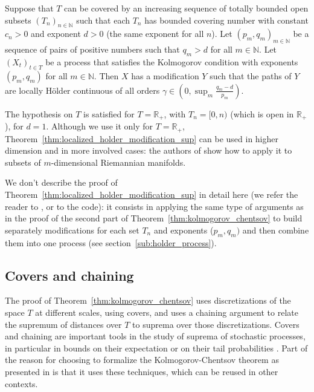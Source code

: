 \documentclass[lean]{Draft}
\begin{document}
\begin{theorem}\label{thm:localized_holder_modification_sup}
Suppose that $T$ can be covered by an increasing sequence of totally bounded open subsets $(T_n)_{n \in \mathbb{N}}$ such that each $T_n$ has bounded covering number with constant $c_n > 0$ and exponent $d > 0$ (the same exponent for all $n$).
Let $(p_m, q_m)_{m \in \mathbb{N}}$ be a sequence of pairs of positive numbers such that $q_m > d$ for all $m \in \mathbb{N}$.
Let $(X_t)_{t \in T}$ be a process that satisfies the Kolmogorov condition with exponents $(p_m, q_m)$ for all $m \in \mathbb{N}$.
Then $X$ has a modification $Y$ such that the paths of $Y$ are locally Hölder continuous of all orders $\gamma \in \left(0, \sup_m \frac{q_m - d}{p_m}\right)$.
\end{theorem}

The hypothesis on $T$ is satisfied for $T = \mathbb{R}_+$, with $T_n = [0,n)$ (which is open in $\mathbb{R}_+$), for $d = 1$.
Although we use it only for $T = \mathbb{R}_+$, Theorem~\ref{thm:localized_holder_modification_sup} can be used in higher dimension and in more involved cases: the authors of \cite{kratschmer2023kolmogorov} show how to apply it to subsets of $m$-dimensional Riemannian manifolds.

We don't describe the proof of Theorem~\ref{thm:localized_holder_modification_sup} in detail here (we refer the reader to \cite{kratschmer2023kolmogorov}, or to the code): it consists in applying the same type of arguments as in the proof of the second part of Theorem~\ref{thm:kolmogorov_chentsov} to build separately modifications for each set $T_n$ and exponents ($p_m, q_m)$ and then combine them into one process (see section~\ref{sub:holder_process}).



\subsection{Covers and chaining}

The proof of Theorem~\ref{thm:kolmogorov_chentsov} uses discretizations of the space $T$ at different scales, using covers, and uses a chaining argument to relate the supremum of distances over $T$ to suprema over those discretizations.
Covers and chaining are important tools in the study of suprema of stochastic processes, in particular in bounds on their expectation or on their tail probabilities \cite{talagrand2022upper, vershynin2018high}.
Part of the reason for choosing to formalize the Kolmogorov-Chentsov theorem as presented in \cite{kratschmer2023kolmogorov} is that it uses these techniques, which can be reused in other contexts.
\end{document}

